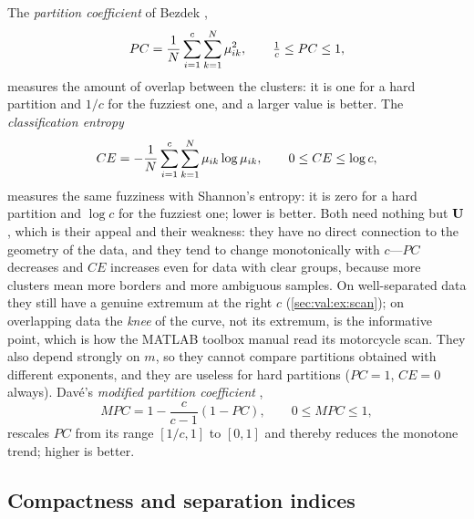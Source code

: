 The \emph{partition coefficient} of Bezdek \cite{bezdek:1981},
\begin{equation}
  PC=\frac1N\sum_{i=1}^{c}\sum_{k=1}^{N}\mu_{ik}^2,\qquad \tfrac1c\le PC\le1,
  \label{eq:val:pc}
\end{equation}
measures the amount of overlap between the clusters: it is one for a hard partition and $1/c$ for the fuzziest one, and a larger value is better. The \emph{classification entropy}
\begin{equation}
  CE=-\frac1N\sum_{i=1}^{c}\sum_{k=1}^{N}\mu_{ik}\log\mu_{ik},\qquad 0\le CE\le\log c,
  \label{eq:val:ce}
\end{equation}
measures the same fuzziness with Shannon's entropy: it is zero for a hard partition and $\log c$ for the fuzziest one; lower is better. Both need nothing but $\mathbf{U}$, which is their appeal and their weakness: they have no direct connection to the geometry of the data, and they tend to change monotonically with $c$---$PC$ decreases and $CE$ increases even for data with clear groups, because more clusters mean more borders and more ambiguous samples. On well-separated data they still have a genuine extremum at the right $c$ (\cref{sec:val:ex:scan}); on overlapping data the \emph{knee} of the curve, not its extremum, is the informative point, which is how the MATLAB toolbox manual read its motorcycle scan. They also depend strongly on $m$, so they cannot compare partitions obtained with different exponents, and they are useless for hard partitions ($PC=1$, $CE=0$ always). Dav\'e's \emph{modified partition coefficient} \cite{dave:1996:mpc},
\begin{equation}
  MPC=1-\frac{c}{c-1}(1-PC),\qquad 0\le MPC\le1,
  \label{eq:val:mpc}
\end{equation}
rescales $PC$ from its range $[1/c,1]$ to $[0,1]$ and thereby reduces the monotone trend; higher is better.

\subsection{Compactness and separation indices}\label{sec:val:geometric}

